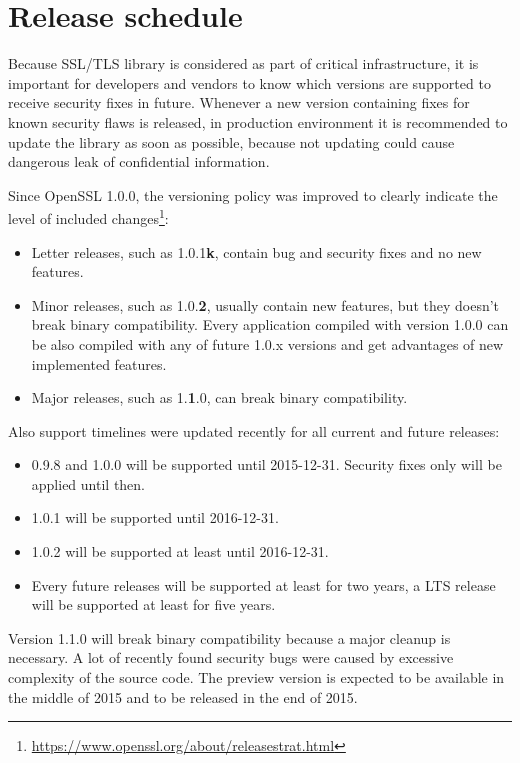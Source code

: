 \section{Release schedule}

Because SSL/TLS library is considered as part of critical infrastructure, it is important for developers and vendors to know which versions are supported to receive security fixes in future. Whenever a new version containing fixes for known security flaws is released, in production environment it is recommended to update the library as soon as possible, because not updating could cause dangerous leak of confidential information.

Since OpenSSL 1.0.0, the versioning policy was improved to clearly indicate the level of included changes\footnote{\url{https://www.openssl.org/about/releasestrat.html}}:

\begin{itemize}
  \item Letter releases, such as 1.0.1\textbf{k}, contain bug and security fixes and no new features.
  \item Minor releases, such as 1.0.\textbf{2}, usually contain new features, but they doesn't break binary compatibility. Every application compiled with version 1.0.0 can be also compiled with any of future 1.0.x versions and get advantages of new implemented features.
  \item Major releases, such as 1.\textbf{1}.0, can break binary compatibility.
\end{itemize}

Also support timelines were updated recently for all current and future releases:

\begin{itemize}
  \item 0.9.8 and 1.0.0 will be supported until 2015-12-31. Security fixes only will be applied until then.
  \item 1.0.1 will be supported until 2016-12-31.
  \item 1.0.2 will be supported at least until 2016-12-31.
  \item Every future releases will be supported at least for two years, a LTS release will be supported at least for five years.
\end{itemize}

Version 1.1.0 will break binary compatibility because a major cleanup is necessary. A lot of recently found security bugs were caused by excessive complexity of the source code. The preview version is expected to be available in the middle of 2015 and to be released in the end of 2015.

